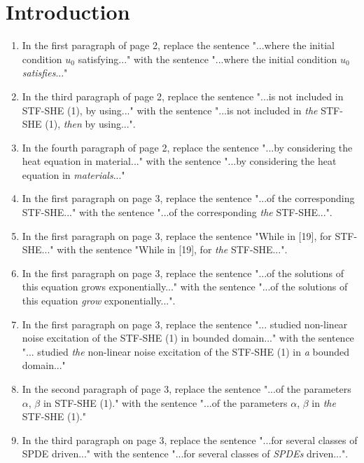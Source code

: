 \documentclass[a4paper,11pt]{article}
\numberwithin{equation}{section}
\numberwithin{equation}{section}
\theoremstyle{plain}
\theoremstyle{definition}
\begin{document}
\section{Introduction}
\begin{enumerate}
	\item 
In the first paragraph of page 2, replace the sentence "...where the initial condition $u_0$ satisfying..." with the sentence "...where the initial condition $u_0$ \textit{satisfies}..."

	\item 
In the third paragraph of page 2, replace the sentence "...is not included in STF-SHE (1), by using..." with the sentence "...is not included in \textit{the} STF-SHE (1), \textit{then} by using...". 

	\item
In the fourth paragraph of page 2, replace the sentence "...by considering the heat equation in material..." with the sentence "...by considering the heat equation in \textit{materials}..."

	\item
In the first paragraph on page 3, replace the sentence "...of the corresponding STF-SHE..." with the sentence "...of the corresponding \textit{the} STF-SHE...".

	\item 
In the first paragraph on page 3, replace the sentence "While in [19], for STF-SHE..." with the sentence  "While in [19], for \textit{the} STF-SHE...".

	\item
In the first paragraph on page 3, replace the sentence "...of the solutions of this equation grows exponentially..." with the sentence "...of the solutions of this equation \textit{grow} exponentially...".

	\item
In the first paragraph on page 3, replace the sentence "... studied non-linear noise excitation of the STF-SHE (1) in bounded domain..." with the sentence "... studied \textit{the} non-linear noise excitation of the STF-SHE (1) in \textit{a} bounded domain..."

	\item
In the second paragraph of page 3, replace the sentence "...of the parameters $\alpha$, $\beta$ in STF-SHE (1)." with the sentence "...of the parameters $\alpha$, $\beta$ in \textit{the} STF-SHE (1)."

	\item
In the third paragraph on page 3, replace the sentence "...for several classes of SPDE driven..." with the sentence "...for several classes of \textit{SPDEs} driven...".


\end{enumerate}
\end{document}
